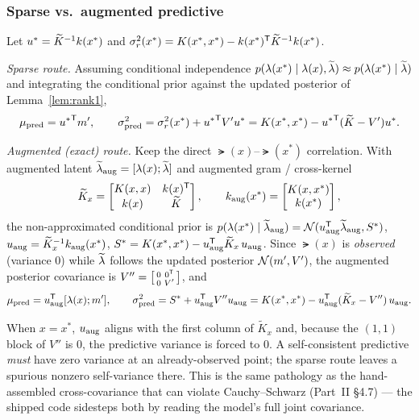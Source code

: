 \subsubsection{Sparse vs.\ augmented predictive}
Let $u^*=\widetilde{K}^{-1}k(x^*)$ and $\sigma_{r}^{2}(x^*)=K(x^*,x^*)-k(x^*)^{\mathsf{T}}\widetilde{K}^{-1}k(x^*)$.

\emph{Sparse route.} Assuming conditional independence $p(\lambda(x^*)\mid\lambda(x),\widetilde{\lambda})\approx p(\lambda(x^*)\mid\widetilde{\lambda})$ and integrating the conditional prior against the updated posterior of Lemma~\ref{lem:rank1},
\[
  \mu_{\mathrm{pred}}={u^*}^{\mathsf{T}}m',\qquad
  \sigma^{2}_{\mathrm{pred}}=\sigma_{r}^{2}(x^*)+{u^*}^{\mathsf{T}}V'u^*
                       =K(x^*,x^*)-{u^*}^{\mathsf{T}}(\widetilde{K}-V')u^*.
\]

\emph{Augmented (exact) route.} Keep the direct $\lat(x)$--$\lat(x^*)$
correlation. With augmented latent $\widetilde{\lambda}_{\mathrm{aug}}=[\lambda(x);\widetilde{\lambda}]$ and
augmented gram / cross-kernel
\[
  \widetilde{K}_{x}=\begin{bmatrix}K(x,x) & k(x)^{\mathsf{T}}\\ k(x) & \widetilde{K}\end{bmatrix},
  \qquad
  k_{\mathrm{aug}}(x^*)=\begin{bmatrix}K(x,x^*)\\ k(x^*)\end{bmatrix},
\]
the non-approximated conditional prior is
$p(\lambda(x^*)\mid\widetilde{\lambda}_{\mathrm{aug}})=\mathcal{N}(u_{\mathrm{aug}}^{\mathsf{T}}\widetilde{\lambda}_{\mathrm{aug}},S^*)$,
$u_{\mathrm{aug}}=\widetilde{K}_x^{-1}k_{\mathrm{aug}}(x^*)$,
$S^*=K(x^*,x^*)-u_{\mathrm{aug}}^{\mathsf{T}}\widetilde{K}_x\,u_{\mathrm{aug}}$.
Since $\lat(x)$ is \emph{observed} (variance $0$) while $\widetilde{\lambda}$ follows the
updated posterior $\mathcal{N}(m',V')$, the augmented posterior covariance is
$V''=\bigl[\begin{smallmatrix}0&0^{\mathsf{T}}\\0&V'\end{smallmatrix}\bigr]$, and
\[
  \mu_{\mathrm{pred}}=u_{\mathrm{aug}}^{\mathsf{T}}[\lambda(x);m'],\qquad
  \sigma^{2}_{\mathrm{pred}}=S^*+u_{\mathrm{aug}}^{\mathsf{T}} V''u_{\mathrm{aug}}
                       =K(x^*,x^*)-u_{\mathrm{aug}}^{\mathsf{T}}(\widetilde{K}_x-V'')\,u_{\mathrm{aug}}.
\]

\begin{remark}
When $x=x^*$, $u_{\mathrm{aug}}$ aligns with the first column of
$\widetilde{K}_x$ and, because the $(1,1)$ block of $V''$ is $0$, the predictive
variance is forced to $0$. A self-consistent predictive \emph{must} have zero
variance at an already-observed point; the sparse route leaves a spurious nonzero
self-variance there. This is the same pathology as the hand-assembled
cross-covariance that can violate Cauchy--Schwarz (Part~II \S4.7) --- the shipped
code sidesteps both by reading the model's full joint covariance.
\end{remark}

